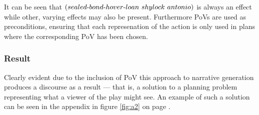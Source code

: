 It can be seen that $(sealed\text{-} bond\text{-} hover\text{-} loan\ shylock\ antonio)$ is always an effect while other, varying effects may also be present. Furthermore PoVs are used as preconditions, ensuring that each represenation of the action is only used in plans where the corresponding PoV has been chosen.%

\subsubsection{Result}
Clearly evident due to the inclusion of PoV this approach to narrative generation produces a discourse as a result --- that is, a solution to a planning problem representing what a viewer of the play might see. An example of such a solution can be seen in the appendix in figure \ref{fig:a2} on page \pageref{fig:a2}.
